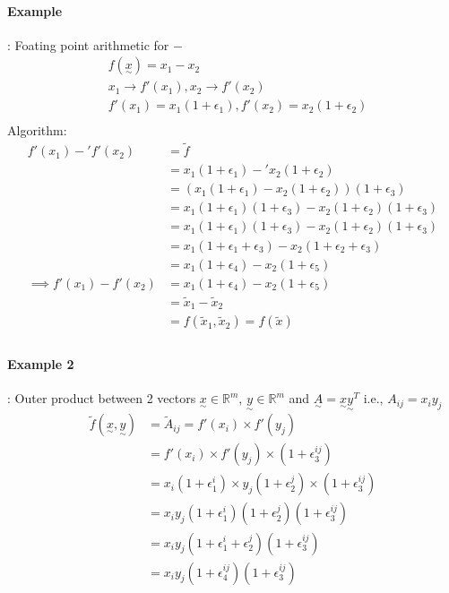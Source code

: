 \documentclass{article}
\newcommand{\T}[1]{\underset{\sim}{#1}}
\begin{document}
\paragraph{Example}: Foating point arithmetic for $-$
\begin{align*}
  &f(\T{x}) = x_1 - x_2\\
  &x_1 \rightarrow f'(x_1), x_2 \rightarrow f'(x_2)\\
  &f'(x_1) = x_1(1 + \epsilon_1), f'(x_2) = x_2(1 + \epsilon_2)\\
\end{align*}
Algorithm:
\begin{align*}
f'(x_1) -' f'(x_2) &= \tilde{f}\\
  &= x_1(1 + \epsilon_1) -' x_2(1 + \epsilon_2)\\
  &= (x_1(1 + \epsilon_1) - x_2(1 + \epsilon_2))(1 + \epsilon_3)\\
  &= x_1(1 + \epsilon_1)(1 + \epsilon_3) - x_2(1 + \epsilon_2)(1 + \epsilon_3)\\
  &= x_1(1 + \epsilon_1)(1 + \epsilon_3) - x_2(1 + \epsilon_2)(1 + \epsilon_3)\\
  &= x_1(1 + \epsilon_1 + \epsilon_3) - x_2(1 + \epsilon_2 + \epsilon_3)\\
  &= x_1(1 + \epsilon_4) - x_2(1 + \epsilon_5)\\
  \implies f'(x_1) - f'(x_2) &= x_1(1 + \epsilon_4) - x_2(1 + \epsilon_5)\\
  &= \tilde{x}_1 - \tilde{x}_2\\
  &= f(\tilde{x}_1, \tilde{x}_2) = f(\tilde{x})\\
\end{align*}

\paragraph{Example 2}: Outer product between 2 vectors $\T{x} \in \mathbb{R}^m$, $\T{y} \in \mathbb{R}^m$ and $\T{A} = \T{x}\T{y}^T$ i.e., $A_{ij} = x_iy_j$
\begin{align*}
  \tilde{f}(\T{x}, \T{y}) &= \tilde{A}_{ij} = f'(x_i) \times f'(y_j)\\
                          &= f'(x_i) \times f'(y_j) \times (1 + \epsilon_3^{ij})\\
                          &= x_i(1 + \epsilon_1^i) \times y_j(1 + \epsilon_2^j) \times (1 + \epsilon_3^{ij})\\
                          &= x_iy_j(1 + \epsilon_1^i)(1 + \epsilon_2^j)(1 + \epsilon_3^{ij})\\
                          &= x_iy_j(1 + \epsilon_1^i + \epsilon_2^j)(1 + \epsilon_3^{ij})\\
                          &= x_iy_j(1 + \epsilon_4^{ij})(1 + \epsilon_3^{ij})\\
\end{align*}
\end{document}
